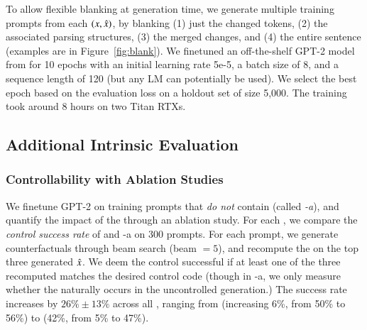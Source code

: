 To allow flexible blanking at generation time, we generate multiple training prompts from each $(x, \hat{x})$, by blanking (1) just the changed tokens, (2) the associated parsing structures, (3) the merged changes, and (4) the entire sentence (examples are in Figure~\ref{fig:blank}).
We finetuned an off-the-shelf GPT-2 model from \citet{Wolf2019HuggingFacesTS} for 10 epochs with an initial learning rate 5e-5, a batch size of 8, and a sequence length of 120 (but any LM can potentially be used).
We select the best epoch based on the evaluation loss on a holdout set of size 5,000.
The training took around 8 hours on two Titan RTXs.


\subsection{Additional Intrinsic Evaluation}
\label{appendix:intrinsic}

\subsubsection{Controllability with Ablation Studies}
\label{appendix:ablation_control}



We finetune GPT-2 on training prompts that \emph{do not} contain \tagstrs (called \emph{\sysname-a}), and quantify the impact of the \tagstrshorts through an ablation study.
For each \tagstr, we compare the \emph{control success rate} of \sysname and \sysname-a on 300 prompts.
For each prompt, we generate counterfactuals through beam search (beam $=5$), and recompute the \tagstrshorts on the top three generated $\hat{x}$.
We deem the control successful if at least one of the three recomputed \tagstrshorts matches the desired control code (though in \sysname-a, we only measure whether the \tagstrshort naturally occurs in the uncontrolled generation.)
The success rate increases by $26\% \pm 13\%$ across all \tagstrs, ranging from  (increasing 6\%, from 50\% to 56\%) to  (42\%, from 5\% to 47\%).


